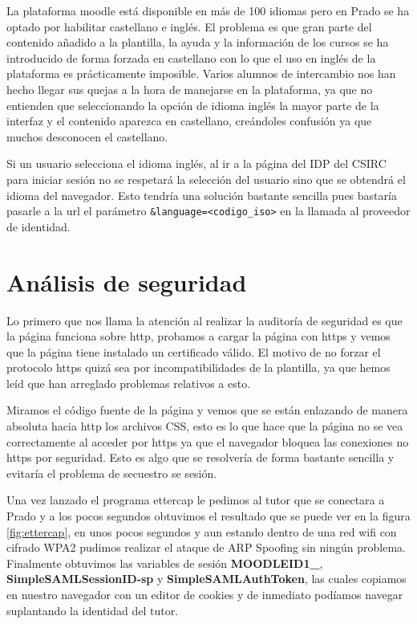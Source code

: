 \bigskip
La plataforma moodle está disponible en más de 100 idiomas pero en Prado se ha optado por habilitar castellano e inglés. El problema es que gran parte del contenido añadido a la plantilla, la ayuda y la información de los cursos se ha introducido de forma forzada en castellano con lo que el uso en inglés de la plataforma es prácticamente imposible. Varios alumnos de intercambio nos han hecho llegar sus quejas a la hora de manejarse en la plataforma, ya que no entienden que seleccionando la opción de idioma inglés la mayor parte de la interfaz y el contenido aparezca en castellano, creándoles confusión ya que muchos desconocen el castellano.

\bigskip
Si un usuario selecciona el idioma inglés, al ir a la página del IDP del CSIRC para iniciar sesión no se respetará la selección del usuario sino que se obtendrá el idioma del navegador. Esto tendría una solución bastante sencilla pues bastaría pasarle a la url el parámetro \texttt{\&language=<codigo\_iso>} en la llamada al proveedor de identidad.


\section{Análisis de seguridad}

Lo primero que nos llama la atención al realizar la auditoría de seguridad es que la página funciona sobre http, probamos a cargar la página con https y vemos que la página tiene instalado un certificado válido. El motivo de no forzar el protocolo https quizá sea por incompatibilidades de la plantilla, ya que hemos leíd que han arreglado problemas relativos a esto\cite{art_11}.

\bigskip
Miramos el código fuente de la página y vemos que se están enlazando de manera absoluta hacia http los archivos CSS, esto es lo que hace que la página no se vea correctamente al acceder por https ya que el navegador bloquea las conexiones no https por seguridad. Esto es algo que se resolvería de forma bastante sencilla y evitaría el problema de secuestro se sesión.

\bigskip
Una vez lanzado el programa ettercap le pedimos al tutor que se conectara a Prado y a los pocos segundos obtuvimos el resultado que se puede ver en la figura \ref{fig:ettercap}, en unos pocos segundos y aun estando dentro de una red wifi con cifrado WPA2 pudimos realizar el ataque de ARP Spoofing sin ningún problema. Finalmente obtuvimos las variables de sesión \textbf{MOODLEID1\_}, \textbf{SimpleSAMLSessionID-sp} y \textbf{SimpleSAMLAuthToken}, las cuales copiamos en nuestro navegador con un editor de cookies y de inmediato podíamos navegar suplantando la identidad del tutor.

